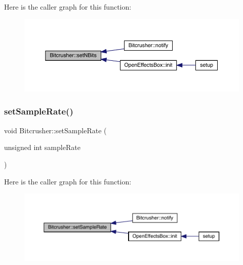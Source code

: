 Here is the caller graph for this function\+:\nopagebreak
\begin{figure}[H]
\begin{center}
\leavevmode
\includegraphics[width=350pt]{class_bitcrusher_a4c2ecf3d6fc604a9967685256a886503_icgraph}
\end{center}
\end{figure}
\mbox{\label{class_bitcrusher_a0b50f63f1b533074ef8acd41714ae1d3}} 
\subsubsection{\texorpdfstring{set\+Sample\+Rate()}{setSampleRate()}}
{\footnotesize\ttfamily void Bitcrusher\+::set\+Sample\+Rate (\begin{DoxyParamCaption}\item[{unsigned int}]{sample\+Rate }\end{DoxyParamCaption})}

Here is the caller graph for this function\+:\nopagebreak
\begin{figure}[H]
\begin{center}
\leavevmode
\includegraphics[width=350pt]{class_bitcrusher_a0b50f63f1b533074ef8acd41714ae1d3_icgraph}
\end{center}
\end{figure}
\mbox{\label{class_bitcrusher_a2ea948d02aaeec7ef5af9dd35346d29c}} 
